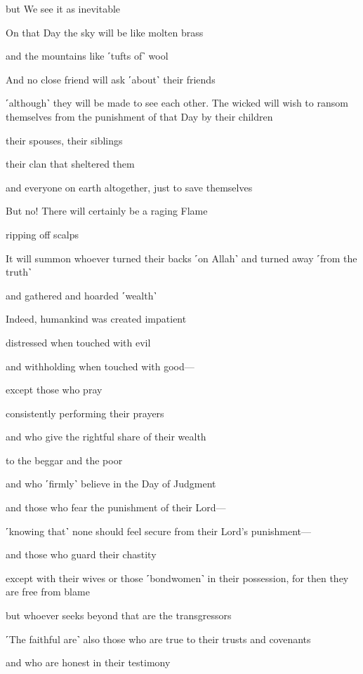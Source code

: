 but We see it as inevitable

On that Day the sky will be like molten brass

and the mountains like ˹tufts of˺ wool

And no close friend will ask ˹about˺ their friends

˹although˺ they will be made to see each other. The wicked will wish to ransom themselves from the punishment of that Day by their children

their spouses, their siblings

their clan that sheltered them

and everyone on earth altogether, just to save themselves

But no! There will certainly be a raging Flame

ripping off scalps

It will summon whoever turned their backs ˹on Allah˺ and turned away ˹from the truth˺

and gathered and hoarded ˹wealth˺

Indeed, humankind was created impatient

distressed when touched with evil

and withholding when touched with good—

except those who pray

consistently performing their prayers

and who give the rightful share of their wealth

to the beggar and the poor

and who ˹firmly˺ believe in the Day of Judgment

and those who fear the punishment of their Lord—

˹knowing that˺ none should feel secure from their Lord’s punishment—

and those who guard their chastity

except with their wives or those ˹bondwomen˺ in their possession, for then they are free from blame

but whoever seeks beyond that are the transgressors

˹The faithful are˺ also those who are true to their trusts and covenants

and who are honest in their testimony

